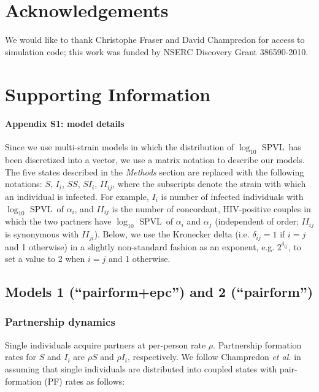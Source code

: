 \documentclass[10pt,letterpaper]{article}
\newcommand{\Lspvl}{$\log_{10}$ SPVL}
\newcommand{\etal}{\textit{et al.}}
\begin{document}
\section*{Acknowledgements}
We would like to thank Christophe Fraser and
David Champredon for access to simulation code;
this work was funded by NSERC Discovery Grant 386590-2010.


\section*{Supporting Information}

\paragraph*{Appendix S1: model details}
\label{S1_Appendix}

Since we use multi-strain models in which the distribution of \Lspvl\ has been discretized into a vector, we use a matrix notation to describe our models. The five states described in the \emph{Methods} section are replaced with the following notations: $S$, $I_i$, $SS$, $SI_i$, $II_{ij}$, where the subscripts denote the strain with which an individual is infected. For example, $I_i$ is number of infected individuals with \Lspvl\ of $\alpha_i$, and $II_{ij}$ is the number of concordant, HIV-positive couples in which the two partners have \Lspvl\ of $\alpha_i$ and $\alpha_j$ (independent of order; $II_{ij}$ is synonymous with $II_{ji}$). 
Below, we use the Kronecker delta (i.e. $\delta_{ij}=1$ if $i=j$ and 1 otherwise) in a slightly non-standard fashion as an exponent, e.g. $2^{\delta_{ij}}$, to set a value to 2 when $i=j$ and 1 otherwise.

\subsection*{Models 1 (``pairform+epc'') and 2 (``pairform'')}

\subsubsection*{Partnership dynamics}

Single individuals acquire partners at per-person rate $\rho$. Partnership formation rates for $S$ and $I_i$ are $\rho S$ and $\rho I_i$, respectively. We follow Champredon \etal \cite{champredon_hiv_2013} in assuming that single individuals are distributed into coupled states with pair-formation (PF) rates as follows:
\end{document}
